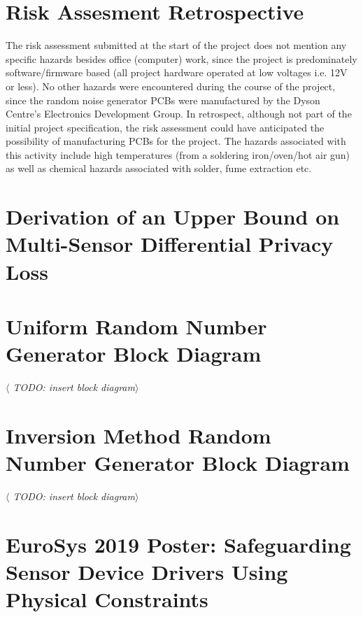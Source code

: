 \documentclass[12pt]{article}
\begin{document}
\begin{appendix}


  \section{Risk Assesment Retrospective}
    The risk assessment submitted at the start of the project does not mention any specific hazards besides office (computer) work, since the project is predominately software/firmware based (all project hardware operated at low voltages i.e. 12V or less). No other hazards were encountered during the course of the project, since the random noise generator PCBs were manufactured by the Dyson Centre's Electronics Development Group. In retrospect, although not part of the initial project specification, the risk assessment could have anticipated the possibility of manufacturing PCBs for the project. The hazards associated with this activity include high temperatures (from a soldering iron/oven/hot air gun) as well as chemical hazards associated with solder, fume extraction etc.




  \section{Derivation of an Upper Bound on Multi-Sensor Differential Privacy Loss}




  \section{Uniform Random Number Generator Block Diagram}
    \textit{$\langle$ TODO: insert block diagram$\rangle$}



  \section{Inversion Method Random Number Generator Block Diagram}
    \textit{$\langle$ TODO: insert block diagram$\rangle$}



  \section{EuroSys 2019 Poster: Safeguarding Sensor Device Drivers Using Physical Constraints}

\end{appendix}
\end{document}
